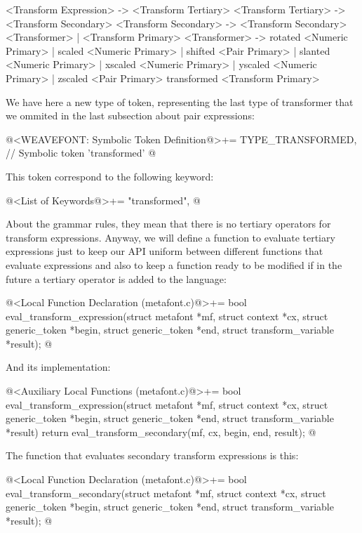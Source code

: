 \alinhaverbatim
<Transform Expression> -> <Transform Tertiary>
<Transform Tertiary> -> <Transform Secondary>
<Transform Secondary> -> <Transform Secondary> <Transformer> |
                         <Transform Primary>
<Transformer> -> rotated <Numeric Primary> |
                 scaled <Numeric Primary> |
                 shifted <Pair Primary> |
                 slanted <Numeric Primary> |
                 xscaled <Numeric Primary> |
                 yscaled <Numeric Primary> |
                 zscaled <Pair Primary>
                 transformed <Transform Primary>
\alinhanormal

We have here a new type of token, representing the last type of
transformer that we ommited in the last subsection about pair
expressions:

\iniciocodigo
@<WEAVEFONT: Symbolic Token Definition@>+=
TYPE_TRANSFORMED,  // Symbolic token 'transformed'
@
\fimcodigo

This token correspond to the following keyword:

\iniciocodigo
@<List of Keywords@>+=
"transformed",
@
\fimcodigo


About the grammar rules, they mean that there is no tertiary operators
for transform expressions. Anyway, we will define a function to
evaluate tertiary expressions just to keep our API uniform between
different functions that evaluate expressions and also to keep a
function ready to be modified if in the future a tertiary operator is
added to the language:

\iniciocodigo
@<Local Function Declaration (metafont.c)@>+=
bool eval_transform_expression(struct metafont *mf, struct context *cx,
                               struct generic_token *begin,
                               struct generic_token *end,
                               struct transform_variable *result);
@
\fimcodigo

And its implementation:

\iniciocodigo
@<Auxiliary Local Functions (metafont.c)@>+=
bool eval_transform_expression(struct metafont *mf, struct context *cx,
                               struct generic_token *begin,
                               struct generic_token *end,
                               struct transform_variable *result){
  return eval_transform_secondary(mf, cx, begin, end, result);
}
@
\fimcodigo

The function that evaluates secondary transform expressions is this:

\iniciocodigo
@<Local Function Declaration (metafont.c)@>+=
bool eval_transform_secondary(struct metafont *mf, struct context *cx,
                              struct generic_token *begin,
                              struct generic_token *end,
                              struct transform_variable *result);
@
\fimcodigo

